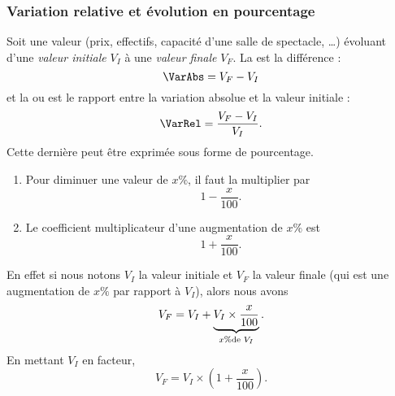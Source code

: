 \subsubsection{Variation relative et évolution en pourcentage}

\begin{definition}
    Soit une valeur (prix, effectifs, capacité d'une salle de spectacle, \ldots) évoluant d'une \emph{valeur initiale} \( V_I\) à une \emph{valeur finale} \( V_F\). La  est la différence :
    \begin{equation}
        \VarAbs=V_F-V_I
    \end{equation}
    et la  ou  est le rapport entre la variation absolue et la valeur initiale :
    \begin{equation}
        \VarRel=\frac{ V_F-V_I }{ V_I }.
    \end{equation}
    Cette dernière peut être exprimée sous forme de pourcentage.
\end{definition}

\begin{Aretenir}
    \begin{enumerate}
        \item
            Pour diminuer une valeur de \( x\%\), il faut la multiplier par 
            \begin{equation}
                1-\frac{ x }{ 100 }.
            \end{equation}
        \item
            Le coefficient multiplicateur d'une augmentation de \( x\%\) est
            \begin{equation}
                1+\frac{ x }{ 100 }.
            \end{equation}
    \end{enumerate}
\end{Aretenir}

En effet si nous notons \( V_I\) la valeur initiale et \( V_F\) la valeur finale (qui est une augmentation de \( x\%\) par rapport à \( V_I\)), alors nous avons
\begin{equation}
    V_F=V_I+\underbrace{V_I\times \frac{ x }{ 100 }}_{x\% \text{de \( V_I\)}}.
\end{equation}
En mettant \( V_I\) en facteur,
\begin{equation}
    V_F=V_I\times \left( 1+\frac{ x }{ 100 } \right).
\end{equation}

